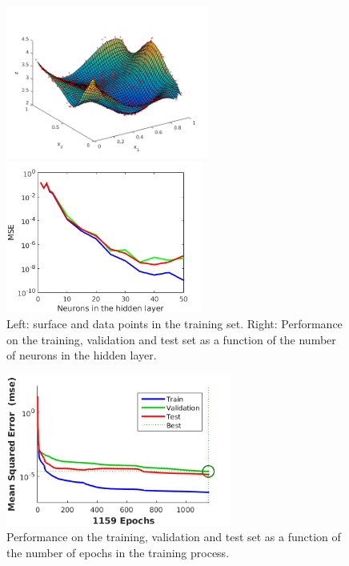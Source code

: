 \documentclass[10pt,a4paper]{article}
\begin{document}
\begin{figure}[tbh]
\centering
\begin{minipage}{0.4\textwidth}
\includegraphics[height=5cm]{figs/train_surface.png}
\end{minipage}%
\begin{minipage}{0.4\textwidth}
\includegraphics[height=5cm]{figs/performance_val.png}
\end{minipage}
\caption{Left: surface and data points in the training set. Right: Performance on the training, validation and test set as a function of the number of neurons in the hidden layer. \label{fig:performance_val}}
\end{figure}

\begin{figure}[tbh]
\centering
\includegraphics[height=5cm]{figs/MSE_final.png}
\caption{Performance on the training, validation and test set as a function of the number of epochs in the training process. \label{fig:MSE_final}}
\end{figure}
\end{document}
